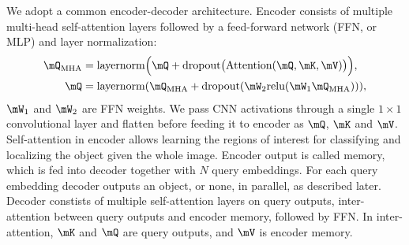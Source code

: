 We adopt a common encoder-decoder architecture.
Encoder consists of multiple multi-head self-attention layers followed by a feed-forward network (FFN, or MLP) and layer normalization:
\begin{align}
    \mQ_\text{MHA} &= \text{layernorm}\Big(\mQ + \text{dropout}\big(\text{Attention}(\mQ, \mK, \mV)
        \big)\Big),\\
    \mQ &= \text{layernorm}(\mQ_\text{MHA} + \text{dropout}(\mW_2\text{relu}(\mW_1\mQ_\text{MHA}))),
    \label{eq:mha}
\end{align}
$\mW_1$ and $\mW_2$ are FFN weights.
We pass CNN activations through a single $1\times1$ convolutional layer and flatten
before feeding it to encoder as $\mQ$, $\mK$ and $\mV$.
Self-attention in encoder allows learning the regions of interest for classifying and localizing the object given the whole image.
Encoder output is called memory, which is fed into decoder together with $N$ query embeddings.
For each query embedding decoder outputs an object, or none, in parallel, as described later.
Decoder constists of multiple self-attention layers on query outputs,
inter-attention between query outputs and encoder memory, followed by FFN.
In inter-attention, $\mK$ and $\mQ$ are query outputs, and $\mV$ is encoder memory.
